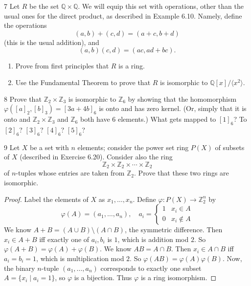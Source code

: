 \begin{problem}{7}
    Let $R$ be the set $\mathbb{Q} \times \mathbb{Q}$. We will equip this set with
    operations, other than the usual ones for the direct product, as described in
    Example 6.10. Namely, define the operations
    \[(a, b) + (c, d) = (a + c, b + d)\]
    (this is the usual addition), and
    \[(a, b)(c, d) = (ac, ad + bc).\]
    \begin{enumerate}
        \item[(a)] Prove from first principles that $R$ is a ring.
        \item[(b)] Use the Fundamental Theorem to prove that $R$ is isomorphic to
        $\mathbb{Q}[x]/\langle x^2 \rangle$.
    \end{enumerate}
\end{problem}
\unsolved

\begin{problem}{8}
    Prove that $\mathbb{Z}_2 \times \mathbb{Z}_3$ is isomorphic to $\mathbb{Z}_6$ by
    showing that the homomorphism $\varphi([a]_2, [b]_3) = [3a + 4b]_6$ is onto and has
    zero kernel. (Or, simply that it is onto and $\mathbb{Z}_2 \times \mathbb{Z}_3$ and
    $\mathbb{Z}_6$ both have 6 elements.) What gets mapped to $[1]_6$? To $[2]_6$?
    $[3]_6$? $[4]_6$? $[5]_6$?
\end{problem}
\unsolved

\begin{problem}{9}
Let $X$ be a set with $n$ elements; consider the power set ring $P(X)$ of subsets of $X$ (described in Exercise 6.20). Consider also the ring
\[
\mathbb{Z}_2 \times \mathbb{Z}_2 \times \cdots \times \mathbb{Z}_2
\]
of $n$-tuples whose entries are taken from $\mathbb{Z}_2$. Prove that these two rings are isomorphic.
\end{problem}
\solved

\begin{proof}
    Label the elements of $X$ as $x_1, \ldots, x_n$. Define $\varphi: P(X) \to \mathbb{Z}_2^n$ by
    \[
    \varphi(A) = (a_1, \ldots, a_n), \quad a_i = \begin{cases} 1 & x_i \in A \\ 0 & x_i \notin A \end{cases}
    \]
    We know $A + B = (A \cup B) \setminus (A \cap B)$, 
        the symmetric difference. 
    Then $x_i \in A + B$ iff exactly one of $a_i, b_i$ is $1$, 
        which is addition mod $2$. So $\varphi(A + B) = \varphi(A) + \varphi(B)$.
    We know $AB = A \cap B$. Then $x_i \in A \cap B$ iff $a_i = b_i = 1$, 
        which is multiplication mod $2$. So $\varphi(AB) = \varphi(A)\varphi(B)$.
    Now, the binary $n$-tuple $(a_1, \ldots, a_n)$
         corresponds to exactly one subset $A = \{x_i \mid a_i = 1\}$, so $\varphi$ is a bijection.
    Thus $\varphi$ is a ring isomorphism.
\end{proof}

